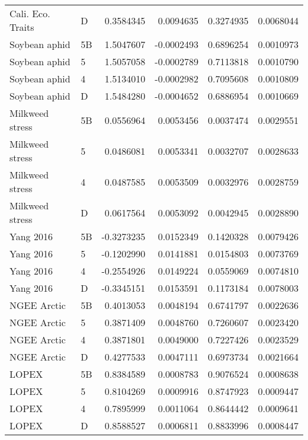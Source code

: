 \begin{tabular}{llrrrr}
Cali. Eco. Traits & D & 0.3584345 & 0.0094635 & 0.3274935 & 0.0068044\\
Soybean aphid & 5B & 1.5047607 & -0.0002493 & 0.6896254 & 0.0010973\\
\addlinespace
Soybean aphid & 5 & 1.5057058 & -0.0002789 & 0.7113818 & 0.0010790\\
Soybean aphid & 4 & 1.5134010 & -0.0002982 & 0.7095608 & 0.0010809\\
Soybean aphid & D & 1.5484280 & -0.0004652 & 0.6886954 & 0.0010669\\
Milkweed stress & 5B & 0.0556964 & 0.0053456 & 0.0037474 & 0.0029551\\
Milkweed stress & 5 & 0.0486081 & 0.0053341 & 0.0032707 & 0.0028633\\
\addlinespace
Milkweed stress & 4 & 0.0487585 & 0.0053509 & 0.0032976 & 0.0028759\\
Milkweed stress & D & 0.0617564 & 0.0053092 & 0.0042945 & 0.0028890\\
Yang 2016 & 5B & -0.3273235 & 0.0152349 & 0.1420328 & 0.0079426\\
Yang 2016 & 5 & -0.1202990 & 0.0141881 & 0.0154803 & 0.0073769\\
Yang 2016 & 4 & -0.2554926 & 0.0149224 & 0.0559069 & 0.0074810\\
\addlinespace
Yang 2016 & D & -0.3345151 & 0.0153591 & 0.1173184 & 0.0078003\\
NGEE Arctic & 5B & 0.4013053 & 0.0048194 & 0.6741797 & 0.0022636\\
NGEE Arctic & 5 & 0.3871409 & 0.0048760 & 0.7260607 & 0.0023420\\
NGEE Arctic & 4 & 0.3871801 & 0.0049000 & 0.7227426 & 0.0023529\\
NGEE Arctic & D & 0.4277533 & 0.0047111 & 0.6973734 & 0.0021664\\
\addlinespace
LOPEX & 5B & 0.8384589 & 0.0008783 & 0.9076524 & 0.0008638\\
LOPEX & 5 & 0.8104269 & 0.0009916 & 0.8747923 & 0.0009447\\
LOPEX & 4 & 0.7895999 & 0.0011064 & 0.8644442 & 0.0009641\\
LOPEX & D & 0.8588527 & 0.0006811 & 0.8833996 & 0.0008447\\
\bottomrule
\end{tabular}